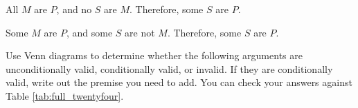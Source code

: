\begin{exercises}
\item All $M$ are $P$, and no $S$ are $M$. Therefore, some $S$ are $P$.
\item Some $M$ are $P$, and some $S$ are not $M$. Therefore, some $S$ are $P$.
\end{exercises}
    
\noindent \problempart Use Venn diagrams to determine whether the following arguments are unconditionally valid, conditionally valid, or invalid. If they are conditionally valid, write out the premise you need to add. You can check your answers against Table \ref{tab:full_twentyfour}.

